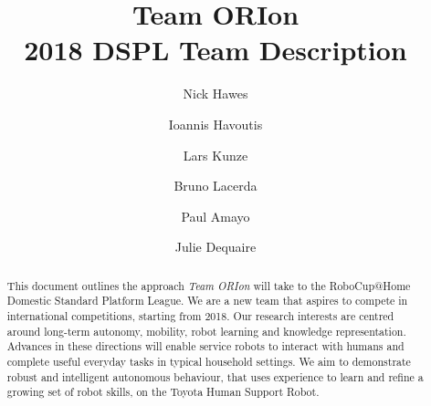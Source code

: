 \documentclass[runningheads,a4paper]{llncs}
\newcommand{\teamori}{Team ORIon}
\begin{document}
\title{\teamori\\ 2018 DSPL Team Description}

\author{Nick Hawes \and Ioannis Havoutis \and Lars Kunze \and Bruno Lacerda \and Paul Amayo \and Julie Dequaire }
\maketitle



\begin{abstract}
This document outlines the approach \textit{\teamori{}} will take to the 
RoboCup@Home Domestic Standard Platform League. 
We are a new team that aspires to compete in international competitions,
starting from 2018. Our research interests are centred around long-term
autonomy, mobility, robot learning and knowledge representation. 
Advances in these directions will enable service robots to interact with humans
and complete useful everyday tasks in typical household settings. 
We aim to demonstrate robust and intelligent autonomous behaviour, that uses
experience to learn and refine a growing set of robot skills, on the Toyota
Human Support Robot.
\end{abstract}



\end{document}
